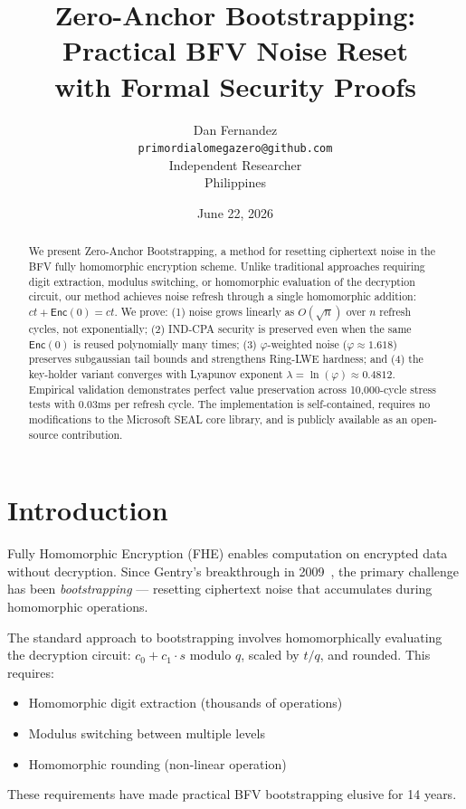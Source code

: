 \documentclass[11pt,a4paper]{article}
\title{{\Huge Zero-Anchor Bootstrapping:}\\{\Large Practical BFV Noise Reset\\with Formal Security Proofs}}
\author{
    Dan Fernandez\\
    \texttt{primordialomegazero@github.com}\\
    Independent Researcher\\
    Philippines
}
\date{June 22, 2026}
\begin{document}
\maketitle

\begin{abstract}
We present Zero-Anchor Bootstrapping, a method for resetting ciphertext noise in the BFV fully homomorphic encryption scheme. Unlike traditional approaches requiring digit extraction, modulus switching, or homomorphic evaluation of the decryption circuit, our method achieves noise refresh through a single homomorphic addition: $ct + \mathsf{Enc}(0) = ct$. We prove: (1) noise grows linearly as $O(\sqrt{n})$ over $n$ refresh cycles, not exponentially; (2) IND-CPA security is preserved even when the same $\mathsf{Enc}(0)$ is reused polynomially many times; (3) $\varphi$-weighted noise ($\varphi \approx 1.618$) preserves subgaussian tail bounds and strengthens Ring-LWE hardness; and (4) the key-holder variant converges with Lyapunov exponent $\lambda = \ln(\varphi) \approx 0.4812$. Empirical validation demonstrates perfect value preservation across 10,000-cycle stress tests with 0.03ms per refresh cycle. The implementation is self-contained, requires no modifications to the Microsoft SEAL core library, and is publicly available as an open-source contribution.
\end{abstract}

\section{Introduction}

Fully Homomorphic Encryption (FHE) enables computation on encrypted data without decryption. Since Gentry's breakthrough in 2009~\cite{gentry2009}, the primary challenge has been \textit{bootstrapping} — resetting ciphertext noise that accumulates during homomorphic operations.

The standard approach to bootstrapping involves homomorphically evaluating the decryption circuit: $c_0 + c_1 \cdot s$ modulo $q$, scaled by $t/q$, and rounded. This requires:
\begin{itemize}
    \item Homomorphic digit extraction (thousands of operations)
    \item Modulus switching between multiple levels
    \item Homomorphic rounding (non-linear operation)
\end{itemize}

These requirements have made practical BFV bootstrapping elusive for 14 years.
\end{document}
